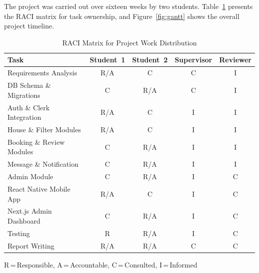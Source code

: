 \documentclass[12pt,a4paper]{report}
\begin{document}
The project was carried out over sixteen weeks by two students. Table~\ref{tab:raci}
presents the RACI matrix for task ownership, and Figure~\ref{fig:gantt} shows the overall
project timeline.

\begin{table}[H]
\caption{RACI Matrix for Project Work Distribution}
\label{tab:raci}
\centering
\small
{}
\begin{tabularx}{\textwidth}{|X|c|c|c|c|}
\hline
\textbf{Task} & \textbf{Student~1} & \textbf{Student~2} & \textbf{Supervisor} & \textbf{Reviewer} \\
\hline
Requirements Analysis    & R/A & C   & C & I \\
\hline
DB Schema \& Migrations  & C   & R/A & C & I \\
\hline
Auth \& Clerk Integration & R/A & C   & I & I \\
\hline
House \& Filter Modules  & R/A & C   & I & I \\
\hline
Booking \& Review Modules& C   & R/A & I & I \\
\hline
Message \& Notification  & C   & R/A & I & I \\
\hline
Admin Module             & C   & R/A & I & C \\
\hline
React Native Mobile App  & R/A & C   & I & C \\
\hline
Next.js Admin Dashboard  & C   & R/A & I & C \\
\hline
Testing                  & R   & R/A & I & C \\
\hline
Report Writing           & R/A & R/A & C & C \\
\hline
\end{tabularx}
\end{table}
{\small R\,=\,Responsible, A\,=\,Accountable, C\,=\,Consulted, I\,=\,Informed}
\end{document}
